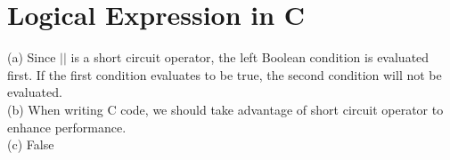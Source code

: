 \documentclass[11pt]{article}
\begin{document}
\section{Logical Expression in C}
(a) Since $||$ is a short circuit operator, the left Boolean condition is evaluated first. If the first condition evaluates to be true, the second condition will not be evaluated.\\
(b) When writing C code, we should take advantage of short circuit operator to enhance performance.\\
(c) False
\end{document}
